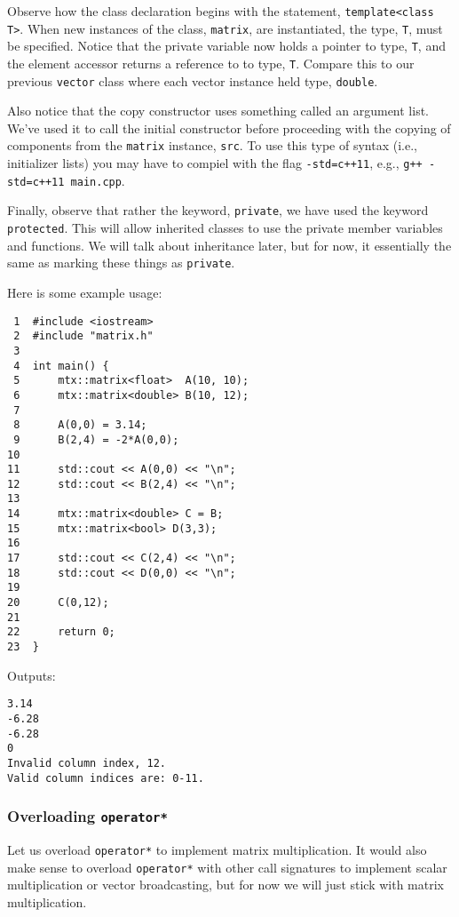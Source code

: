 \documentclass[11pt]{article}
\begin{document}
Observe how the class declaration begins with the statement, \texttt{template<class T>}.
When new instances of the class, \texttt{matrix}, are instantiated, the type, \texttt{T}, must 
be specified. Notice that the private variable now holds a pointer to type, \texttt{T}, 
and the element accessor returns a reference to to type, \texttt{T}. Compare this to 
our previous \texttt{vector} class where each vector instance held type, \texttt{double}.

Also notice that the copy constructor uses something called an argument list. 
We've used it to call the initial constructor before proceeding with the copying
of components from the \texttt{matrix} instance, \texttt{src}. To use this type of syntax (i.e., 
initializer lists) you may have to compiel with the flag \texttt{-std=c++11}, e.g.,
\texttt{g++ -std=c++11 main.cpp}.

Finally, observe that rather the keyword, \texttt{private}, we have used the keyword 
\texttt{protected}. This will allow inherited classes to use the private member variables 
and functions. We will talk about inheritance later, but for now, it essentially
the same as marking these things as \texttt{private}.

Here is some example usage:

\begin{verbatim}
 1  #include <iostream>
 2  #include "matrix.h"
 3  
 4  int main() {
 5      mtx::matrix<float>  A(10, 10);
 6      mtx::matrix<double> B(10, 12);
 7  
 8      A(0,0) = 3.14;
 9      B(2,4) = -2*A(0,0);
10  
11      std::cout << A(0,0) << "\n";
12      std::cout << B(2,4) << "\n";
13  
14      mtx::matrix<double> C = B;
15      mtx::matrix<bool> D(3,3);
16  
17      std::cout << C(2,4) << "\n";
18      std::cout << D(0,0) << "\n";
19  
20      C(0,12);
21  
22      return 0;
23  }
\end{verbatim}

Outputs:

\begin{verbatim}
3.14
-6.28
-6.28
0
Invalid column index, 12.
Valid column indices are: 0-11.
\end{verbatim}

\subsubsection{Overloading \texttt{operator*}}
\label{sec:orgheadline60}

Let us overload \texttt{operator*} to implement matrix multiplication. It would also
make sense to overload \texttt{operator*} with other call signatures to implement scalar 
multiplication or vector broadcasting, but for now we will just stick with 
matrix multiplication.
\end{document}
